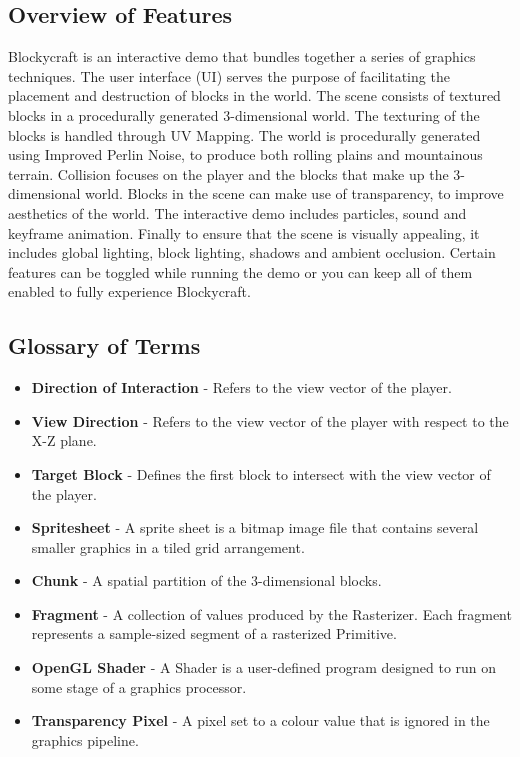 \documentclass[a4paper,11pt,titlepage]{scrartcl}
\newcommand{\Blockycraft}{Blockycraft}
\begin{document}
\subsection{Overview of Features}
\Blockycraft{} is an interactive demo that bundles together a series of graphics techniques. The user interface (UI) serves the purpose of facilitating the placement and destruction of blocks in the world. The scene consists of textured blocks in a procedurally generated 3-dimensional world. The texturing of the blocks is handled through UV Mapping. The world is procedurally generated using Improved Perlin Noise, to produce both rolling plains and mountainous terrain. Collision focuses on the player and the blocks that make up the 3-dimensional world. Blocks in the scene can make use of transparency, to improve aesthetics of the world. The interactive demo includes particles, sound and keyframe animation. Finally to ensure that the scene is visually appealing, it includes global lighting, block lighting, shadows and ambient occlusion. Certain features can be toggled while running the demo or you can keep all of them enabled to fully experience \Blockycraft{}.

\subsection{Glossary of Terms}
\begin{itemize}
\item \textbf{Direction of Interaction} - Refers to the view vector of the player.
\item \textbf{View Direction} - Refers to the view vector of the player with respect to the X-Z plane.
\item \textbf{Target Block} - Defines the first block to intersect with the view vector of the player.
\item \textbf{Spritesheet} - A sprite sheet is a bitmap image file that contains several smaller graphics in a tiled grid arrangement.
\item \textbf{Chunk} - A spatial partition of the 3-dimensional blocks.
\item \textbf{Fragment} - A collection of values produced by the Rasterizer. Each fragment represents a sample-sized segment of a rasterized Primitive.
\item \textbf{OpenGL Shader} - A Shader is a user-defined program designed to run on some stage of a graphics processor.
\item \textbf{Transparency Pixel} -  A pixel set to a colour value that is ignored in the graphics pipeline.
\end{itemize}
\end{document}
